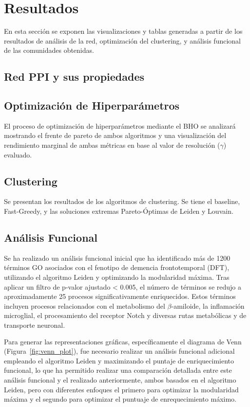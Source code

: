 \section{Resultados}
En esta sección se exponen las visualizaciones y tablas generadas a partir de los resultados de análisis de la red, optimización del clustering, y análisis funcional de las comunidades obtenidas. 

\subsection{Red PPI y sus propiedades}



\newpage

\subsection{Optimización de Hiperparámetros}

El proceso de optimización de hiperparámetros mediante el BHO se analizará mostrando el frente de pareto de ambos algoritmos y una visualización del rendimiento marginal de ambas métricas en base al valor de resolución (\(\gamma\)) evaluado.


\subsection{Clustering}

Se presentan los resultados de los algoritmos de clustering. Se tiene el baseline, Fast-Greedy, y las soluciones extremas Pareto-Óptimas de Leiden y Louvain.

\subsection{Análisis Funcional}

Se ha realizado un análisis funcional inicial que ha identificado más de 1200 términos GO asociados con el fenotipo de demencia frontotemporal (DFT), utilizando el algoritmo Leiden y optimizando la modularidad máxima. Tras aplicar un filtro de p-valor ajustado \textless{} 0.005, el número de términos se redujo a aproximadamente 25 procesos significativamente enriquecidos. Estos términos incluyen procesos relacionados con el metabolismo del \(\beta\)-amiloide, la inflamación microglial, el procesamiento del receptor Notch y diversas rutas metabólicas y de transporte neuronal.

Para generar las representaciones gráficas, específicamente el diagrama de Venn (Figura~\ref{fig:venn_plot}), fue necesario realizar un análisis funcional adicional empleando el algoritmo Leiden y maximizando el puntaje de enriquecimiento funcional, lo que ha permitido realizar una comparación detallada entre este análisis funcional y el realizado anteriormente, ambos basados en el algoritmo Leiden, pero con diferentes enfoques el primero para optimizar la modularidad máxima y el segundo para optimizar el puntuaje de enrequecimiento máximo.


